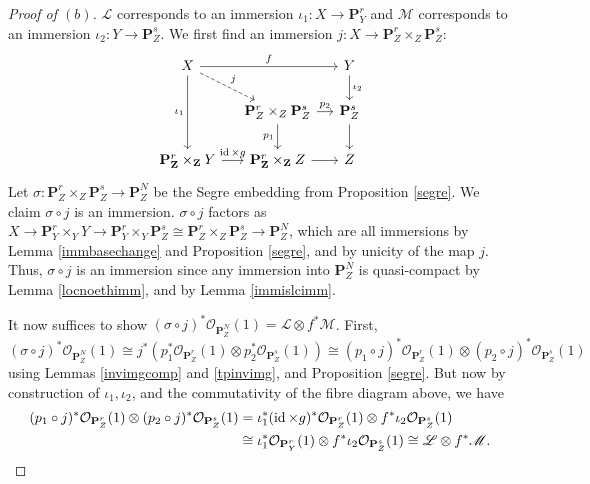 \documentclass[10pt]{article}
\theoremstyle{definition}
\theoremstyle{remark}
\numberwithin{equation}{section}
\numberwithin{figure}{subsubsection}
\DeclareMathOperator{\id}{id}
\newcommand{\LL}{\mathscr{L}}
\newcommand{\MM}{\mathscr{M}}
\newcommand{\OO}{\mathcal{O}}
\begin{document}
\begin{proof}[Proof of $(b)$]
  $\LL$ corresponds to an immersion $\iota_1\colon X \to \mathbf{P}^r_Y$ and $\MM$ corresponds to an immersion $\iota_2\colon Y \to \mathbf{P}^s_Z$. We first find an immersion $j\colon X \to \mathbf{P}^r_Z \times_Z \mathbf{P}^s_Z$:
  \begin{equation*}
    \begin{tikzcd}[column sep=small]
      X\arrow{dd}[swap]{\iota_1} \arrow{rr}{f}\arrow[dashed]{dr}{j} & & Y\dar{\iota_2}\\
      & \mathbf{P}^r_Z \times_Z \mathbf{P}^s_Z\dar[swap]{p_1}\rar{p_2} & \mathbf{P}^s_Z\dar\\
      \mathbf{P}^r_{\mathbf{Z}} \times_{\mathbf{Z}} Y \rar{\id \times g} & \mathbf{P}^r_{\mathbf{Z}} \times_{\mathbf{Z}} Z \rar & Z
    \end{tikzcd}
  \end{equation*}
  Let $\sigma\colon \mathbf{P}^r_Z \times_Z \mathbf{P}^s_Z \to \mathbf{P}^N_Z$ be the Segre embedding from Proposition \ref{segre}. We claim $\sigma \circ j$ is an immersion. $\sigma \circ j$ factors as $X \to \mathbf{P}^r_Y \times_Y Y \to \mathbf{P}^r_Y \times_Y \mathbf{P}^s_Z \cong \mathbf{P}^r_Z \times_Z \mathbf{P}^s_Z \to \mathbf{P}^N_Z$, which are all immersions by Lemma \ref{immbasechange} and Proposition \ref{segre}, and by unicity of the map $j$. Thus, $\sigma \circ j$ is an immersion since any immersion into $\mathbf{P}^N_Z$ is quasi-compact by Lemma \ref{locnoethimm}, and by Lemma \ref{immislcimm}.
  \par It now suffices to show $(\sigma \circ j)^*\OO_{\mathbf{P}^N_Z}(1) = \LL \otimes f^*\MM$. First,
  \begin{equation*}
    (\sigma \circ j)^*\OO_{\mathbf{P}^N_Z}(1) \cong j^*(p_1^*\OO_{\mathbf{P}^r_Z}(1) \otimes p_2^*\OO_{\mathbf{P}^s_Z}(1)) \cong (p_1 \circ j)^*\OO_{\mathbf{P}^r_Z}(1) \otimes (p_2 \circ j)^*\OO_{\mathbf{P}^s_Z}(1)
  \end{equation*}
  using Lemmas \ref{invimgcomp} and \ref{tpinvimg}, and Proposition \ref{segre}. But now by construction of $\iota_1,\iota_2$, and the commutativity of the fibre diagram above, we have
  \begin{align*}
    (p_1 \circ j)^*\OO_{\mathbf{P}^r_Z}(1) \otimes (p_2 \circ j)^*\OO_{\mathbf{P}^s_Z}(1) &= \iota_1^*(\id \times g)^*\OO_{\mathbf{P}^r_Z}(1) \otimes f^*\iota_2\OO_{\mathbf{P}^s_Z}(1)\\
    &\cong \iota_1^*\OO_{\mathbf{P}^r_Y}(1) \otimes f^*\iota_2\OO_{\mathbf{P}^s_Z}(1) \cong \LL \otimes f^*\MM.\qedhere
  \end{align*}
\end{proof}
\end{document}
